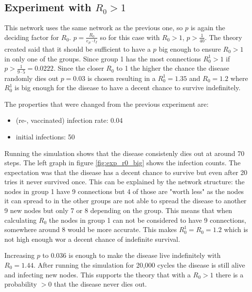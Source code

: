 \subsection{Experiment with $R_0 > 1$}
This network uses the same network as the previous one, so $p$ is again the deciding
factor for $R_0$. $p = \frac{R_0}{e_\mu \cdot t_I}$ so for this case with $R_0 > 1$, $p > \frac{1}{40}$.
The theory created said that it should be sufficient to have a $p$
big enough to ensure $R_0 > 1$ in only one of the groups. Since group 1 has the most connections
$R_0^1 > 1$ if $p > \frac{1}{9\cdot5} = 0.0222$.
Since the closer $R_0$ to 1 the higher the chance the disease randomly dies out $p=0.03$ is chosen
resulting in a $R_0^1 = 1.35$ and $R_0 = 1.2$ where $R_0^1$ is big enough for the disease
to have a decent chance to survive indefinitely.

The properties that were changed from the previous experiment are:
\begin{itemize}
    \item (re-, vaccinated) infection rate: 0.04
    \item initial infections: 50
\end{itemize}

Running the simulation shows that the disease consistenly dies out at around 70 steps.
The left graph in figure \ref{fig:exp_r0_big} shows the infection counts. The expectation
was that the disease has a decent chance to survive but even after 20 tries it never
survived once. This can be explained by the network structure: the nodes in group 1
have 9 connections but 4 of those are "worth less" as the nodes it can spread to in the
other groups are not able to spread the disease to another 9 new nodes but only 7 or 8
depending on the group. This means that when calculating $R_0$ the nodes in group 1 can not
be considered to have 9 connections, somewhere around 8 would be more accurate. This makes
$R_0^1 = R_0 = 1.2$ which is not high enough wor a decent chance of indefinite survival.

Increasing $p$ to 0.036 is enough to make the disease live indefinitely with $R_0 = 1.44$.
After running the simulation for 20,000 cycles the disease is still alive and infecting
new nodes. This supports the theory that with a $R_0 > 1$ there is a probability $> 0$
that the disease never dies out. 


